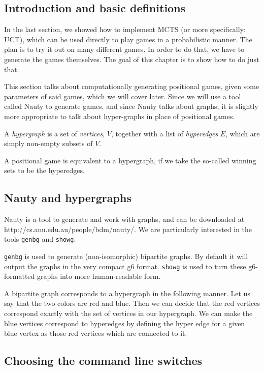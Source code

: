 \subsection{Introduction and basic definitions}

In the last section, we showed how to implement MCTS (or more specifically: UCT), which can be used directly to play games in a probabilistic manner.
The plan is to try it out on many different games.
In order to do that, we have to generate the games themselves.
The goal of this chapter is to show how to do just that.

This section talks about computationally generating positional games, given some parameters of said games, which we will cover later.
Since we will use a tool called Nauty to generate games, and since Nauty talks about graphs, it is slightly more appropriate to talk about hyper-graphs in place of positional games.

\begin{definition}
  A \emph{hypergraph} is a set of \emph{vertices}, $V$, together with a list of \emph{hyperedges} $E$, which are simply non-empty subsets of $V$.
\end{definition}

A positional game is equivalent to a hypergraph, if we take the so-called winning sets to be the hyperedges.

\subsection{Nauty and hypergraphs}


Nauty is a tool to generate and work with graphs, and can be downloaded at http://cs.anu.edu.au/people/bdm/nauty/.
We are particularly interested in the tools \texttt{genbg} and \texttt{showg}.

\texttt{genbg} is used to generate (non-isomorphic) bipartite graphs. By default it will output the graphs in the very compact g6 format.
\texttt{showg} is used to turn these g6-formatted graphs into more human-readable form.

A bipartite graph corresponds to a hypergraph in the following manner.
Let us say that the two colors are red and blue. Then we can decide that the red vertices correspond exactly with the set of vertices in our hypergraph.
We can make the blue vertices correspond to hyperedges by defining the hyper edge for a given blue vertex as those red vertices which are connected to it.


\subsection{Choosing the command line switches}
\label{sec:nautycommandline}

